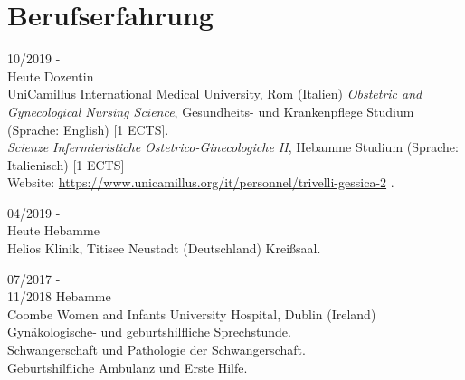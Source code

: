 \documentclass[11pt]{friggeri-cv}
\begin{document}
\vspace{-25pt}
\section{Berufserfahrung}
\begin{entrylist}
  \entry
  {10/2019 -\\Heute}
  {Dozentin}
  {\\UniCamillus International Medical University, Rom (Italien)}
  {
    \emph{Obstetric and Gynecological Nursing Science},
    Gesundheits- und Krankenpflege Studium (Sprache: English) [1 ECTS].\\
    \emph{Scienze Infermieristiche Ostetrico-Ginecologiche II},
    Hebamme Studium (Sprache: Italienisch) [1 ECTS] \\
    Website:
    \footnotesize{\url{https://www.unicamillus.org/it/personnel/trivelli-gessica-2}} .
  }

  \entry
  {04/2019 -\\Heute}
  {Hebamme}
  {\\Helios Klinik, Titisee Neustadt (Deutschland)}
  {Kreißsaal.}

  \entry
  {07/2017 -\\11/2018}
  {Hebamme}
  {\\Coombe Women and Infants University Hospital, Dublin (Ireland)}
  {
    Gyn\"{a}kologische- und geburtshilfliche Sprechstunde.\\
    Schwangerschaft und Pathologie der Schwangerschaft.\\
    Geburtshilfliche Ambulanz und Erste Hilfe.
  }
\end{entrylist}
%
%
\vspace{-10pt}
\end{document}

